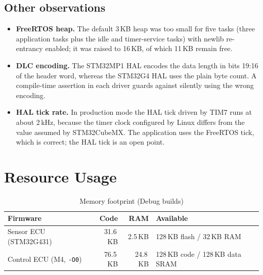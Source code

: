 \subsection{Other observations}

\begin{itemize}
  \item \textbf{FreeRTOS heap.} The default 3\,KB heap was too small for five tasks (three application tasks plus the idle and timer-service tasks) with newlib re-entrancy enabled; it was raised to 16\,KB, of which 11\,KB remain free.
  \item \textbf{DLC encoding.} The STM32MP1 HAL encodes the data length in bits 19:16 of the header word, whereas the STM32G4 HAL uses the plain byte count. A compile-time assertion in each driver guards against silently using the wrong encoding.
  \item \textbf{HAL tick rate.} In production mode the HAL tick driven by TIM7 runs at about 2\,kHz, because the timer clock configured by Linux differs from the value assumed by STM32CubeMX. The application uses the FreeRTOS tick, which is correct; the HAL tick is an open point.
\end{itemize}

\section{Resource Usage}

\begin{table}[H]
\centering
\small
\caption{Memory footprint (Debug builds)}
\label{tab:memory}
\begin{tabular}{@{}lrrl@{}}
\toprule
\textbf{Firmware} & \textbf{Code} & \textbf{RAM} & \textbf{Available} \\
\midrule
Sensor ECU (STM32G431) & 31.6\,KB & 2.5\,KB & 128\,KB flash / 32\,KB RAM \\
Control ECU (M4, \texttt{-O0}) & 76.5\,KB & 24.8\,KB & 128\,KB code / 128\,KB data SRAM \\
\bottomrule
\end{tabular}
\end{table}
